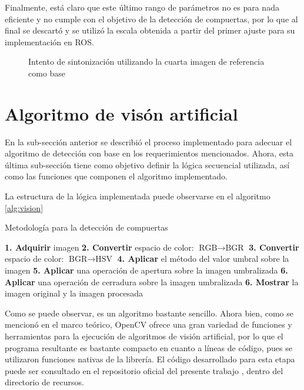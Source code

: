Finalmente, está claro que este último rango de parámetros no es para nada eficiente y no cumple con el objetivo de la detección de compuertas, por lo que al final se descartó y se utilizó la escala obtenida a partir del primer ajuste para su implementación en ROS.

\begin{figure}[ht]
    \centering
    \hfill

    \caption{Intento de sintonización utilizando la cuarta imagen de referencia como base}
    \label{fig:cv_gatesth3}
\end{figure}

\section{Algoritmo de visón artificial}

En la sub-sección anterior se describió el proceso implementado para adecuar el algoritmo de detección con base en los requerimientos mencionados. Ahora, esta última sub-sección tiene como objetivo definir la lógica secuencial utilizada, así como las funciones que componen el algoritmo implementado.

La estructura de la lógica implementada puede observarse en el algoritmo \ref{alg:vision}
\begin{algorithm}
\caption{Metodología para la detección de compuertas}\label{alg:vision}
\begin{algorithmic}
\State \textbf{1. Adquirir} imagen
\State \textbf{2. Convertir }espacio de color: $\text{RGB} \to \text{BGR}$
\State \textbf{3. Convertir }espacio de color: $\text{BGR} \to \text{HSV}$
\State \textbf{4. Aplicar }el método del valor umbral sobre la imagen
\State \textbf{5. Aplicar }una operación de apertura sobre la imagen umbralizada
\State \textbf{6. Aplicar }una operación de cerradura sobre la imagen umbralizada
\State \textbf{6. Mostrar } la imagen original y la imagen procesada
\end{algorithmic}
\end{algorithm}

Como se puede observar, es un algoritmo bastante sencillo. Ahora bien, como se mencionó en el marco teórico, OpenCV ofrece una gran variedad de funciones y herramientas para la ejecución de algoritmos de visión artificial, por lo que el programa resultante es bastante compacto en cuanto a líneas de código, pues se utilizaron funciones nativas de la librería. El código desarrollado para esta etapa puede ser consultado en el repositorio oficial del presente trabajo \citet{Axolotl}, dentro del directorio de recursos.

